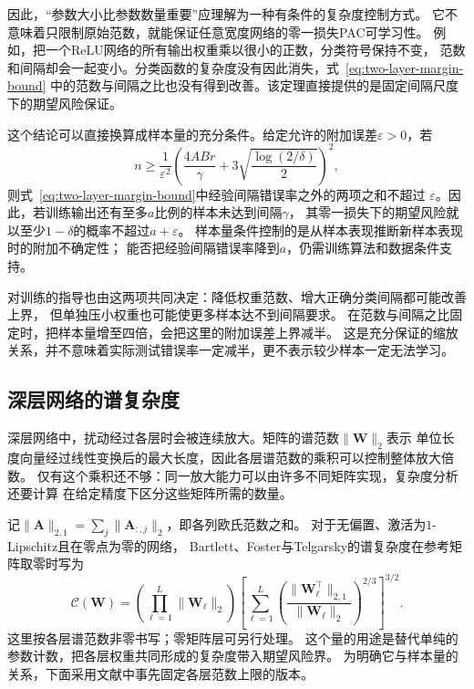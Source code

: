 因此，“参数大小比参数数量重要”应理解为一种有条件的复杂度控制方式。
它不意味着只限制原始范数，就能保证任意宽度网络的零一损失PAC可学习性。
例如，把一个ReLU网络的所有输出权重乘以很小的正数，分类符号保持不变，
范数和间隔却会一起变小。分类函数的复杂度没有因此消失，式~\eqref{eq:two-layer-margin-bound}
中的范数与间隔之比也没有得到改善。该定理直接提供的是固定间隔尺度下的期望风险保证。

这个结论可以直接换算成样本量的充分条件。给定允许的附加误差$\varepsilon>0$，若
\begin{equation}
 n\geq\frac1{\varepsilon^2}
 \left(\frac{4ABr}{\gamma}
       +3\sqrt{\frac{\log(2/\delta)}2}\right)^2,
 \label{eq:two-layer-sample-requirement}
\end{equation}
则式~\eqref{eq:two-layer-margin-bound}中经验间隔错误率之外的两项之和不超过
$\varepsilon$。因此，若训练输出还有至多$a$比例的样本未达到间隔$\gamma$，
其零一损失下的期望风险就以至少$1-\delta$的概率不超过$a+\varepsilon$。
样本量条件控制的是从样本表现推断新样本表现时的附加不确定性；
能否把经验间隔错误率降到$a$，仍需训练算法和数据条件支持。

对训练的指导也由这两项共同决定：降低权重范数、增大正确分类间隔都可能改善上界，
但单独压小权重也可能使更多样本达不到间隔要求。
在范数与间隔之比固定时，把样本量增至四倍，会把这里的附加误差上界减半。
这是充分保证的缩放关系，并不意味着实际测试错误率一定减半，更不表示较少样本一定无法学习。

\subsection{深层网络的谱复杂度}

深层网络中，扰动经过各层时会被连续放大。矩阵的谱范数$\|\bm W\|_2$表示
单位长度向量经过线性变换后的最大长度，因此各层谱范数的乘积可以控制整体放大倍数。
仅有这个乘积还不够：同一放大能力可以由许多不同矩阵实现，复杂度分析还要计算
在给定精度下区分这些矩阵所需的数量。

记$\|\bm A\|_{2,1}=\sum_j\|\bm A_{:,j}\|_2$，即各列欧氏范数之和。
对于无偏置、激活为$1$-Lipschitz且在零点为零的网络，
Bartlett、Foster与Telgarsky的谱复杂度在参考矩阵取零时写为
\begin{equation}
 \mathcal C(\bm W)=
 \left(\prod_{\ell=1}^L\|\bm W_\ell\|_2\right)
 \left[\sum_{\ell=1}^L
 \left(\frac{\|\bm W_\ell^\top\|_{2,1}}{\|\bm W_\ell\|_2}\right)^{2/3}
 \right]^{3/2}.
 \label{eq:spectral-margin-bound}
\end{equation}
这里按各层谱范数非零书写；零矩阵层可另行处理。
这个量的用途是替代单纯的参数计数，把各层权重共同形成的复杂度带入期望风险界。
为明确它与样本量的关系，下面采用文献中事先固定各层范数上限的版本。

